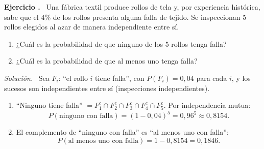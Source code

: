 \documentclass[11pt,a4paper]{article}
\newcounter{ejnum}
\newenvironment{ejercicio}{\refstepcounter{ejnum}\par\medskip\noindent\textbf{Ejercicio \theejnum.}~}{\par}
\newenvironment{solucion}{\par\noindent\textit{Solución.}~}{\par\vspace{1em}}
\begin{document}
\begin{ejercicio}
Una fábrica textil produce rollos de tela y, por experiencia histórica, sabe que el $4\%$ de los rollos presenta alguna falla de tejido. Se inspeccionan 5 rollos elegidos al azar de manera independiente entre sí.
\begin{enumerate}[label=(\alph*)]
\item ¿Cuál es la probabilidad de que ninguno de los 5 rollos tenga falla?
\item ¿Cuál es la probabilidad de que al menos uno tenga falla?
\end{enumerate}
\end{ejercicio}
\begin{solucion}
Sea $F_i$: ``el rollo $i$ tiene falla'', con $P(F_i)=0{,}04$ para cada $i$, y los sucesos son independientes entre sí (inspecciones independientes).
\begin{enumerate}[label=(\alph*)]
\item ``Ninguno tiene falla'' $= F_1^c\cap F_2^c\cap F_3^c\cap F_4^c\cap F_5^c$. Por independencia mutua:
\[
P(\text{ninguno con falla}) = (1-0{,}04)^5 = 0{,}96^5 \approx 0{,}8154.
\]
\item El complemento de ``ninguno con falla'' es ``al menos uno con falla'':
\[
P(\text{al menos uno con falla}) = 1-0{,}8154 = 0{,}1846.
\]
\end{enumerate}
\end{solucion}
\end{document}
